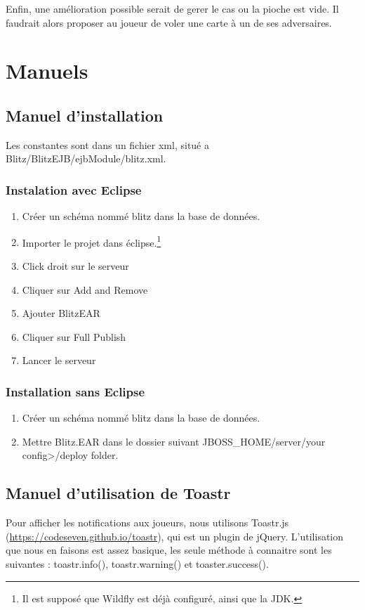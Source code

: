 \documentclass[11pt]{scrreprt}
\begin{document}
    Enfin, une amélioration possible serait de gerer le cas ou la pioche est vide. Il faudrait alors proposer au joueur de voler une carte à un de ses adversaires.
    \chapter{Manuels}
    \section{Manuel d'installation}
    Les constantes sont dans un fichier xml, situé a Blitz/BlitzEJB/ejbModule/blitz.xml.

    \subsection{Instalation avec Eclipse}
    \begin{enumerate}
        \item Créer un schéma nommé \og blitz\fg{} dans la base de données.
        \item Importer le projet dans éclipse.\footnote{Il est supposé que Wildfly est déjà configuré, ainsi que la JDK.}
        \item Click droit sur le serveur
        \item Cliquer sur \og Add and Remove\fg{}
        \item Ajouter \og BlitzEAR\fg{}
        \item Cliquer sur \og Full Publish\fg{}
        \item Lancer le serveur
    \end{enumerate}
    \subsection{Installation sans Eclipse}
    \begin{enumerate}
        \item Créer un schéma nommé \og blitz\fg{} dans la base de données.
        \item Mettre Blitz.EAR dans le dossier suivant JBOSS\_HOME/server/your config>/deploy folder.
    \end{enumerate}

    \section{Manuel d'utilisation de Toastr}
    Pour afficher les notifications aux joueurs, nous utilisons Toastr.js (\url{https://codeseven.github.io/toastr}), qui est un plugin de jQuery. L'utilisation que nous en faisons est assez basique, les seule méthode à connaitre sont les suivantes : toastr.info(), toastr.warning() et toaster.success().
\end{document}
